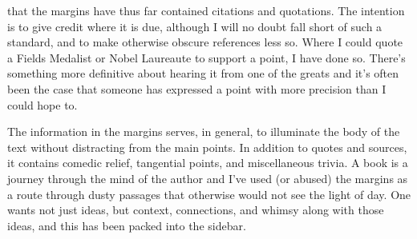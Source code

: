  that the margins have thus far contained citations
and quotations. The intention is to give credit where it is due,  although I will
no doubt fall short of such a standard, and to make otherwise obscure references less
so. Where I could quote a Fields Medalist or Nobel Laureaute to support a point, I
have done so. There's something more definitive about hearing it from one of
the greats and it's often been the case that someone has expressed a point with more
precision than I could hope to.

The information in the margins serves, in general, to illuminate the body of the
text without distracting from the main points. In addition to quotes and
sources, it contains comedic relief, tangential points, and miscellaneous
trivia. A book is a journey through the mind of the author and I've used (or
abused) the margins as a route through dusty passages that otherwise would not
see the light of day. One wants not just ideas, but context, connections, and
whimsy along with those ideas, and this has been packed into the sidebar. 

